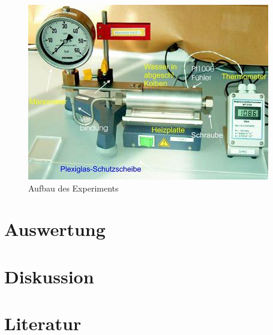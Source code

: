 \documentclass[12pt, a4paper, twoside]{scrartcl}
\begin{document}
\begin{figure} [h]
\centering
\includegraphics[scale=0.8]{aufbau.jpg}
\caption{\label{img:aufbau}Aufbau des Experiments\protect\footnotemark}
\end{figure}



\section{Auswertung}
\label{sec:auswertung}

\section{Diskussion}
\label{sec:diskussion}

\section*{Literatur}
\end{document}
